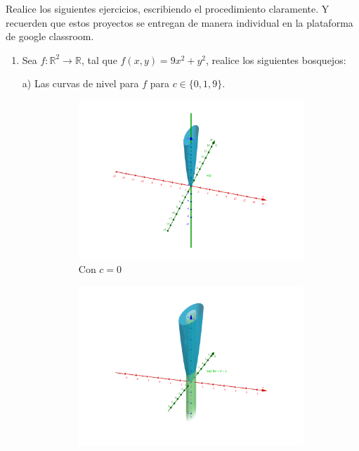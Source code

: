 \documentclass[letterpaper,11pt]{article}
\begin{document}
\noindent Realice los siguientes ejercicios, escribiendo el procedimiento claramente. Y recuerden que estos proyectos se entregan de manera individual en la plataforma de google classroom. 


\begin{enumerate}


\item  Sea $f:\mathbb{R}^2 \longrightarrow \mathbb{R}$, tal que $f(x,y) = 9x^2 + y^2$, realice los siguientes bosquejos: 


a) Las curvas de nivel para $f$ para $c \in \{0, 1, 9\}$.
\begin{figure}[h!]
	\centering
	\begin{subfigure}{0.3\textwidth}
		\includegraphics[width=\linewidth]{img/1a1}
		\caption{Con $ c = 0 $}
	\end{subfigure}
	\begin{subfigure}{0.3\textwidth}
		\includegraphics[width=\linewidth]{img/1a2}

\end{subfigure}
\end{figure}
\end{enumerate}
\end{document}
